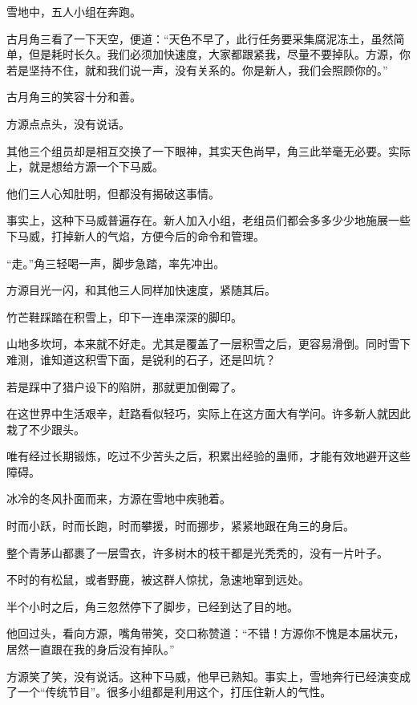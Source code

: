 
\begin{this_body}

雪地中，五人小组在奔跑。

古月角三看了一下天空，便道：“天色不早了，此行任务要采集腐泥冻土，虽然简单，但是耗时长久。我们必须加快速度，大家都跟紧我，尽量不要掉队。方源，你若是坚持不住，就和我们说一声，没有关系的。你是新人，我们会照顾你的。”

古月角三的笑容十分和善。

方源点点头，没有说话。

其他三个组员却是相互交换了一下眼神，其实天色尚早，角三此举毫无必要。实际上，就是想给方源一个下马威。

他们三人心知肚明，但都没有揭破这事情。

事实上，这种下马威普遍存在。新人加入小组，老组员们都会多多少少地施展一些下马威，打掉新人的气焰，方便今后的命令和管理。

“走。”角三轻喝一声，脚步急踏，率先冲出。

方源目光一闪，和其他三人同样加快速度，紧随其后。

竹芒鞋踩踏在积雪上，印下一连串深深的脚印。

山地多坎坷，本来就不好走。尤其是覆盖了一层积雪之后，更容易滑倒。同时雪下难测，谁知道这积雪下面，是锐利的石子，还是凹坑？

若是踩中了猎户设下的陷阱，那就更加倒霉了。

在这世界中生活艰辛，赶路看似轻巧，实际上在这方面大有学问。许多新人就因此栽了不少跟头。

唯有经过长期锻炼，吃过不少苦头之后，积累出经验的蛊师，才能有效地避开这些障碍。

冰冷的冬风扑面而来，方源在雪地中疾驰着。

时而小跃，时而长跑，时而攀援，时而挪步，紧紧地跟在角三的身后。

整个青茅山都裹了一层雪衣，许多树木的枝干都是光秃秃的，没有一片叶子。

不时的有松鼠，或者野鹿，被这群人惊扰，急速地窜到远处。

半个小时之后，角三忽然停下了脚步，已经到达了目的地。

他回过头，看向方源，嘴角带笑，交口称赞道：“不错！方源你不愧是本届状元，居然一直跟在我的身后没有掉队。”

方源笑了笑，没有说话。这种下马威，他早已熟知。事实上，雪地奔行已经演变成了一个“传统节目”。很多小组都是利用这个，打压住新人的气性。


\end{this_body}
